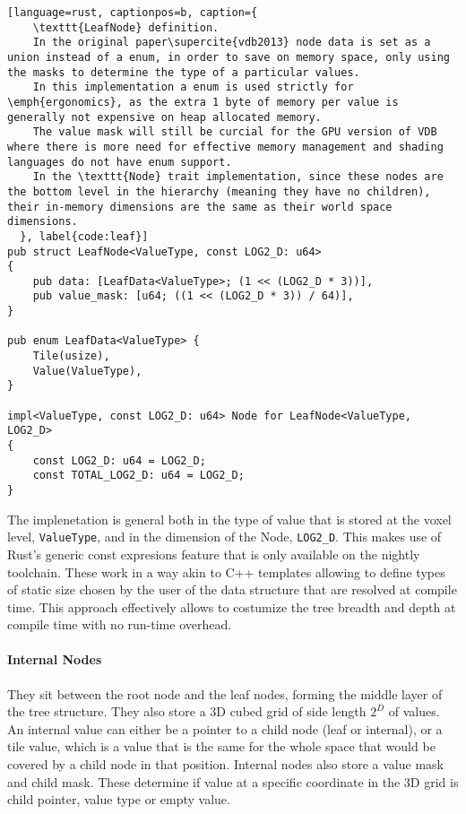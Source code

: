 \begin{lstlisting}[language=rust, captionpos=b, caption={
    \texttt{LeafNode} definition.
    In the original paper\supercite{vdb2013} node data is set as a union instead of a enum, in order to save on memory space, only using the masks to determine the type of a particular values.
    In this implementation a enum is used strictly for \emph{ergonomics}, as the extra 1 byte of memory per value is generally not expensive on heap allocated memory.
    The value mask will still be curcial for the GPU version of VDB where there is more need for effective memory management and shading languages do not have enum support.
    In the \texttt{Node} trait implementation, since these nodes are the bottom level in the hierarchy (meaning they have no children), their in-memory dimensions are the same as their world space dimensions.
  }, label{code:leaf}]
pub struct LeafNode<ValueType, const LOG2_D: u64>
{
    pub data: [LeafData<ValueType>; (1 << (LOG2_D * 3))],
    pub value_mask: [u64; ((1 << (LOG2_D * 3)) / 64)],
}

pub enum LeafData<ValueType> {
    Tile(usize),
    Value(ValueType),
}

impl<ValueType, const LOG2_D: u64> Node for LeafNode<ValueType, LOG2_D>
{
    const LOG2_D: u64 = LOG2_D;
    const TOTAL_LOG2_D: u64 = LOG2_D;
}
\end{lstlisting}

The implenetation is general both in the type of value that is stored at the voxel level, \verb|ValueType|, and in the dimension of the Node, \verb|LOG2_D|. This makes use of Rust's generic const expresions feature \supercite{rust:generic} that is only available on the nightly toolchain. These work in a way akin to C++ templates allowing to define types of static size chosen by the user of the data structure that are resolved at compile time. This approach effectively allows to costumize the tree breadth and depth at compile time with no run-time overhead.

\paragraph{Internal Nodes} They sit between the root node and the leaf nodes, forming the middle layer of the tree structure.
They also store a 3D cubed grid of side length $2^{D}$ of values. An internal value can either be a pointer to a child node (leaf or internal), or a tile value, which is a value that is the same for the whole space that would be covered by a child node in that position.
Internal nodes also store a value mask and child mask. These determine if value at a specific coordinate in the 3D grid is child pointer, value type or empty value.


